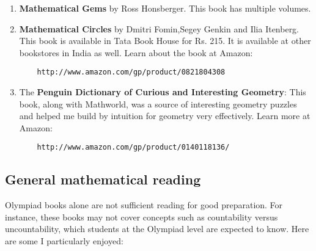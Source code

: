 \documentclass[a4paper]{amsart}
\begin{document}
\begin{enumerate}

\item {\bf Mathematical Gems} by Ross Honsberger. This book has multiple volumes.

\item {\bf Mathematical Circles} by Dmitri Fomin,Segey Genkin and Ilia Itenberg. This book is available in Tata Book House
  for Rs. 215. It is available at other bookstores in India as well. Learn about the book at Amazon:
  
  \begin{verbatim}
    http://www.amazon.com/gp/product/0821804308
  \end{verbatim}


\item The {\bf Penguin Dictionary of Curious and Interesting Geometry}: This book, along with Mathworld, was a source of interesting
  geometry puzzles and helped me build by intuition for geometry very effectively. Learn more at Amazon:
  
  \begin{verbatim}
    http://www.amazon.com/gp/product/0140118136/
  \end{verbatim}


\end{enumerate}

\subsection{General mathematical reading}

Olympiad books alone are not sufficient reading for good preparation. For instance, these books may not cover 
concepts such as countability versus uncountability, which students at the Olympiad level are expected to know.
Here are some I particularly enjoyed:
\end{document}
